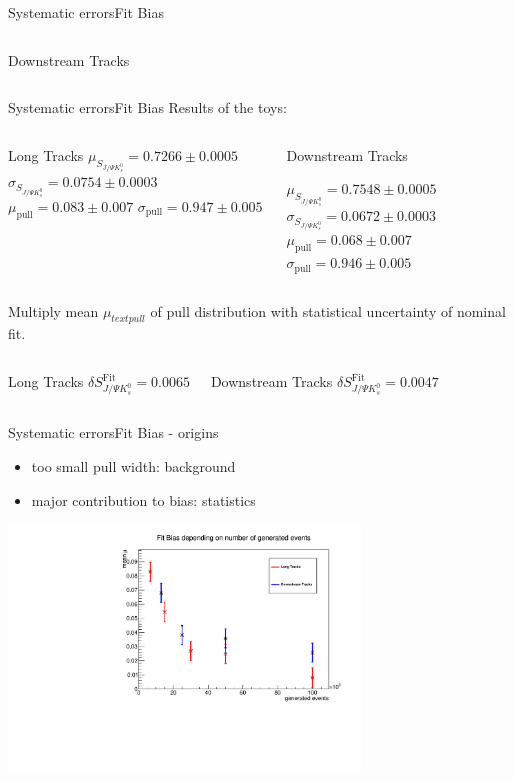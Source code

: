 \documentclass{beamer}
\newcommand{\SJPsi}{S_{J/\Psi K_s^0}}
\begin{document}
\begin{frame}{Systematic errors}{Fit Bias}
\begin{columns}
\begin{block}{Downstream Tracks}
	\end{block}
	\end{columns}
	\end{frame}
	
	\begin{frame}{Systematic errors}{Fit Bias}
	Results of the toys:
	\begin{columns}
	\begin{block}{Long Tracks}
        $\mu_{\SJPsi} = 0.7266 \pm 0.0005$
        $\sigma_{\SJPsi} = 0.0754 \pm 0.0003$
        $\mu_{\text{pull}} = 0.083 \pm 0.007$
        $\sigma_{\text{pull}} = 0.947 \pm 0.005$
    \end{block}
	\begin{block}{Downstream Tracks}
    
        $\mu_{\SJPsi} = 0.7548 \pm 0.0005$
        $\sigma_{\SJPsi} = 0.0672 \pm 0.0003$
        $\mu_{\text{pull}} = 0.068 \pm 0.007$
        $\sigma_{\text{pull}} = 0.946 \pm 0.005$
    \end{block}
    \end{columns}
	\vspace{0.5cm} 
	Multiply mean $\mu_{text{pull}}$ of pull distribution with statistical uncertainty of nominal fit.
	\begin{columns}
	\begin{block}{Long Tracks}
    \centering
        $\delta\SJPsi^{\text{Fit}} = 0.0065$
    \end{block}
	\begin{block}{Downstream Tracks}
    \centering
        $\delta\SJPsi^{\text{Fit}} = 0.0047$
    \end{block}
    \end{columns}
    \end{frame}
	
	\begin{frame}{Systematic errors}{Fit Bias - origins}
    \begin{itemize}
    \item too small pull width: background
    \item major contribution to bias: statistics
    \end{itemize}
    \begin{center}
    \includegraphics[width = 0.7\textwidth]{fit_bias_statistics}
    \end{center}
    \end{frame}
	
\end{document}
